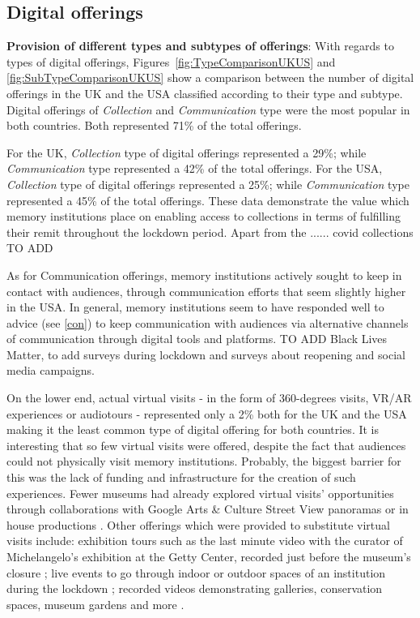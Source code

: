 \documentclass{egpubl}
\begin{document}

\subsection{Digital offerings}
\label{dig}
\noindent \textbf{Provision of different types and subtypes of offerings}:  With regards to types of digital offerings, Figures~\ref{fig:TypeComparisonUKUS} and \ref{fig:SubTypeComparisonUKUS} show a comparison between the number of digital offerings in the UK and the USA classified according to their type and subtype. Digital offerings of \emph{Collection} and \emph{Communication} type were the most popular in both countries. Both represented 71\% of the total offerings. 

For the UK, \emph{Collection} type of digital offerings represented a 29\%; while \emph{Communication} type represented a 42\% of the total offerings. For the USA, \emph{Collection} type of digital offerings represented a 25\%; while \emph{Communication} type represented a 45\% of the total offerings. These data demonstrate the value which memory institutions place on enabling access to collections in terms of fulfilling their remit throughout the lockdown period. Apart from the ...... covid collections TO ADD

As for Communication offerings, memory institutions actively sought to keep in contact with audiences, through communication efforts that seem slightly higher in the USA. In general, memory institutions seem to have responded well to advice (see \ref{con}) to keep communication with audiences via alternative channels of communication through digital tools and platforms. TO ADD Black Lives Matter, to add surveys during lockdown and surveys about reopening and social media campaigns.



On the lower end, actual virtual visits - in the form of 360-degrees visits, VR/AR experiences or audiotours - represented only a 2\% both for the UK and the USA making it the least common type of digital offering for both countries. It is interesting that so few virtual visits were offered, despite the fact that audiences could not physically visit memory institutions. Probably, the biggest barrier for this was the lack of funding and infrastructure for the creation of such experiences. Fewer museums had already explored virtual visits' opportunities through collaborations with Google Arts \& Culture Street View panoramas \cite{GoogleArts&Culture,GoogleArts&Culturea} or in house productions \cite{FrankLloydWrightFoundation,BirminghamMuseum&ArtGallery}. Other offerings which were provided to substitute virtual visits include: exhibition tours such as the last minute video with the curator of Michelangelo's exhibition at the Getty Center, recorded just before the museum's closure \cite{getty2020}; live events to go through indoor or outdoor spaces of an institution during the lockdown \cite{VizcayaMuseum&Gardens2020}; recorded videos demonstrating galleries, conservation spaces, museum gardens and more \cite{Kew2020,ArchaeologyAlexandria2020}.
\end{document}

